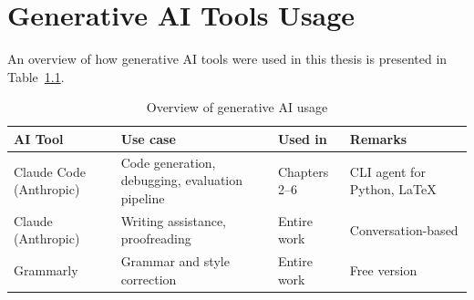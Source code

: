 \documentclass[12pt,a4paper]{book}
\theoremstyle{definition}
\theoremstyle{remark}
\begin{document}
\newpage
\tableofcontents






\appendix
\chapter{Generative AI Tools Usage}
\label{genAIUsage}

An overview of how generative AI tools were used in this thesis is presented in Table~\ref{tab:genAIOverview}.

\begin{table}[h!]
    \centering
    \begin{tabularx}{\textwidth}{|l|X|X|X|}
        \hline \rowcolor{blue!20}
        AI Tool & Use case & Used in & Remarks \\\hline
        Claude Code (Anthropic) & Code generation, debugging, evaluation pipeline & Chapters 2--6 & CLI agent for Python, LaTeX \\ \hline
        Claude (Anthropic) & Writing assistance, proofreading & Entire work & Conversation-based \\ \hline
        Grammarly & Grammar and style correction & Entire work & Free version \\ \hline
    \end{tabularx}
    \caption{Overview of generative AI usage}
    \label{tab:genAIOverview}
\end{table}
\end{document}
